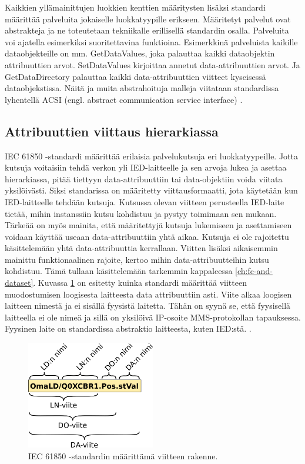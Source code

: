 Kaikkien yllämainittujen luokkien kenttien määritysten lisäksi standardi määrittää palveluita jokaiselle luokkatyypille erikseen. Määritetyt palvelut ovat abstrakteja ja ne toteutetaan tekniikalle erillisellä standardin osalla. Palveluita voi ajatella esimerkiksi suoritettavina funktioina. Esimerkkinä palveluista kaikille dataobjekteille on mm. GetDataValues, joka palauttaa kaikki dataobjektin attribuuttien arvot. SetDataValues kirjoittaa annetut data-attribuuttien arvot. Ja GetDataDirectory palauttaa kaikki data-attribuuttien viitteet kyseisessä dataobjekstissa. Näitä ja muita abstrahoituja malleja viitataan standardissa lyhentellä ACSI (engl. abstract communication service interface) \cite[s.~15,45--46]{IEC61850-7-2} \cite[s.~26]{IEC61850-7-1}.


\subsection{Attribuuttien viittaus hierarkiassa}
IEC 61850 -standardi määrittää erilaisia palvelukutsuja eri luokkatyypeille. Jotta kutsuja voitaisiin tehdä verkon yli IED-laitteelle ja sen arvoja lukea ja asettaa hierarkiassa, pitää tiettyyn data-attribuuttiin tai data-objektiin voida viitata yksilöivästi. Siksi standarissa on määritetty viittausformaatti, jota käytetään kun IED-laitteelle tehdään kutsuja. Kutsussa olevan viitteen perusteella IED-laite tietää, mihin instanssiin kutsu kohdistuu ja pystyy toimimaan sen mukaan. Tärkeää on myös mainita, että määritettyjä kutsuja lukemiseen ja asettamiseen voidaan käyttää useaan data-attribuuttiin yhtä aikaa. Kutsuja ei ole rajoitettu käsittelemään yhtä data-attribuuttia kerrallaan. Viitten lisäksi aikaisemmin mainittu funktionaalinen rajoite, kertoo mihin data-attribuutteihin kutsu kohdistuu. Tämä tullaan käsittelemään tarkemmin kappaleessa \ref{ch:fc-and-dataset}. Kuvassa \ref{fig:iec61850-data-reference} on esitetty kuinka standardi määrittää viitteen muodostumisen loogisesta laitteesta data attribuuttiin asti. Viite alkaa loogisen laitteen nimestä ja ei sisällä fyysistä laitetta. Tähän on syynä se, että fyysisellä laitteella ei ole nimeä ja sillä on yksilöivä IP-osoite MMS-protokollan tapauksessa. Fyysinen laite on standardissa abstraktio laitteesta, kuten IED:stä. \cite[s.~93]{IEC61850-7-1}.

\begin{figure}[ht!]
	\includegraphics[width=0.5\textwidth]{pictures/iec61850-data-reference.png}
	\caption{IEC 61850 -standardin määrittämä viitteen rakenne.}
	\label{fig:iec61850-data-reference}
\end{figure}

